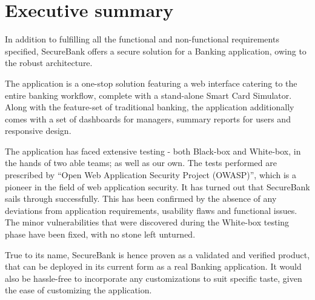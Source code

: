 \chapter{Executive summary}

In addition to fulfilling all the functional and non-functional requirements specified, SecureBank offers a secure solution for a Banking application, owing to the robust architecture.

The application is a one-stop solution featuring a web interface catering to the entire banking workflow, complete with a stand-alone Smart Card Simulator.
Along with the feature-set of traditional banking, the application additionally comes with a set of dashboards for managers, summary reports for users and responsive design.

The application has faced extensive testing - both Black-box and White-box, in the hands of two able teams; as well as our own.
The tests performed are prescribed by \enquote{Open Web Application Security Project (OWASP)}, which is a pioneer in the field of web application security.
It has turned out that SecureBank sails through successfully. This has been confirmed by the absence of any deviations from application requirements, usability flaws and functional issues.
The minor vulnerabilities that were discovered during the White-box testing phase have been fixed, with no stone left unturned.

True to its name, SecureBank is hence proven as a validated and verified product, that can be deployed in its current form as a real Banking application. It would also be hassle-free to incorporate any customizations to suit specific taste, given the ease of customizing the application.